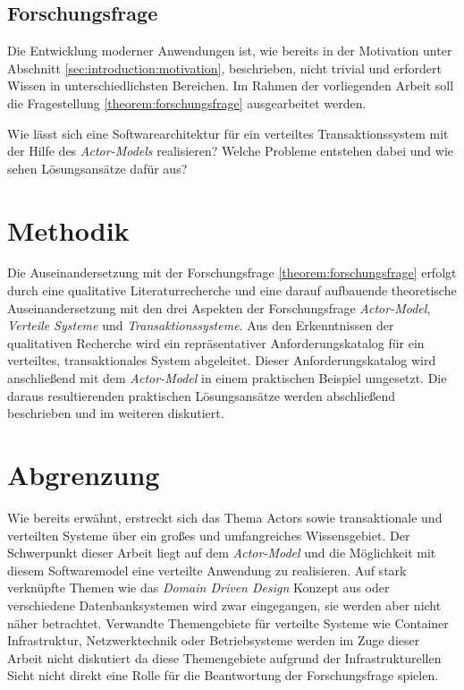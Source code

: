 \subsection{Forschungsfrage}\label{sec:introduction:forschungsfrage}
Die Entwicklung moderner Anwendungen ist, wie bereits in der Motivation unter Abschnitt \ref{sec:introduction:motivation}, beschrieben, nicht trivial und erfordert Wissen in unterschiedlichsten Bereichen. Im Rahmen der vorliegenden Arbeit soll die Fragestellung \ref{theorem:forschungsfrage} ausgearbeitet werden.
\begin{Theorem}
\label{theorem:forschungsfrage}
Wie lässt sich eine Softwarearchitektur für ein verteiltes Transaktionssystem mit der Hilfe des \textit{Actor-Models} realisieren? Welche Probleme entstehen dabei und wie sehen Lösungsansätze dafür aus?
\end{Theorem}
\section{Methodik}
Die Auseinandersetzung mit der Forschungsfrage \ref{theorem:forschungsfrage} erfolgt durch eine qualitative Literaturrecherche und eine darauf aufbauende theoretische Auseinandersetzung mit den drei Aspekten der Forschungsfrage \textit{Actor-Model}, \textit{Verteile Systeme} und \textit{Transaktionssysteme}. Aus den Erkenntnissen der qualitativen Recherche wird ein repräsentativer Anforderungskatalog für ein verteiltes, transaktionales System abgeleitet. Dieser Anforderungskatalog wird anschließend mit dem \textit{Actor-Model} in einem praktischen Beispiel umgesetzt. Die daraus resultierenden praktischen Lösungsansätze werden abschließend beschrieben und im weiteren diskutiert.
 
\section{Abgrenzung}
Wie bereits erwähnt, erstreckt sich das Thema Actors sowie transaktionale und verteilten Systeme über ein großes und umfangreiches Wissensgebiet. Der Schwerpunkt dieser Arbeit liegt auf dem \textit{Actor-Model} und die Möglichkeit mit diesem Softwaremodel eine verteilte Anwendung zu realisieren. Auf stark verknüpfte Themen wie das \textit{Domain Driven Design} Konzept aus \cite{Evans2004Domain-drivenSoftware} oder verschiedene Datenbanksystemen wird zwar eingegangen, sie werden aber nicht näher betrachtet. Verwandte Themengebiete für verteilte Systeme wie Container Infrastruktur, Netzwerktechnik oder Betriebsysteme werden im Zuge dieser Arbeit nicht diskutiert da diese Themengebiete aufgrund der Infrastrukturellen Sicht nicht direkt eine Rolle für die Beantwortung der Forschungsfrage spielen. 

